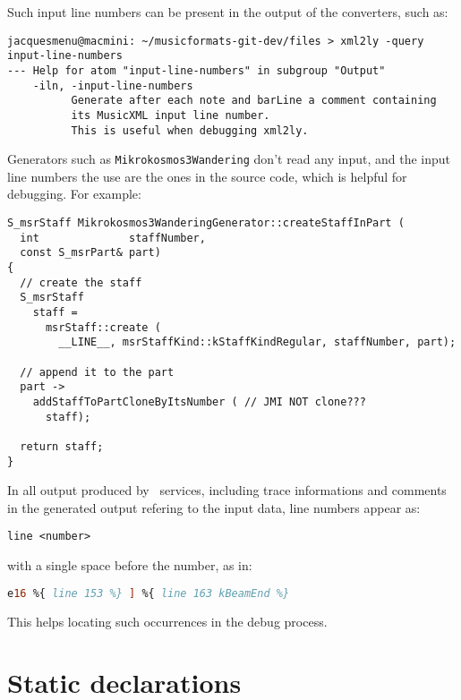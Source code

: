 Such input line numbers can be present in the output of the converters, such as:
\begin{lstlisting}[language=Terminal]
jacquesmenu@macmini: ~/musicformats-git-dev/files > xml2ly -query input-line-numbers
--- Help for atom "input-line-numbers" in subgroup "Output"
    -iln, -input-line-numbers
          Generate after each note and barLine a comment containing
          its MusicXML input line number.
          This is useful when debugging xml2ly.
\end{lstlisting}

Generators such as {\tt Mikrokosmos3Wandering} don't read any input, and the input line numbers the use are the ones in the source code, which is helpful for debugging. For example:
\begin{lstlisting}[language=CPlusPlus]
S_msrStaff Mikrokosmos3WanderingGenerator::createStaffInPart (
  int              staffNumber,
  const S_msrPart& part)
{
  // create the staff
  S_msrStaff
    staff =
      msrStaff::create (
        __LINE__, msrStaffKind::kStaffKindRegular, staffNumber, part);

  // append it to the part
  part ->
    addStaffToPartCloneByItsNumber ( // JMI NOT clone???
      staff);

  return staff;
}
\end{lstlisting}

In all output produced by \mf\ services, including trace informations and comments in the generated output refering to the input data, line numbers appear as:
\begin{lstlisting}[language=Terminal]
	line <number>
\end{lstlisting}
with a single space before the number, as in:
\begin{lstlisting}[language=Lilypond]
	e16 %{ line 153 %} ] %{ line 163 kBeamEnd %}
\end{lstlisting}

This helps locating such occurrences in the debug process.


\section{Static declarations}


